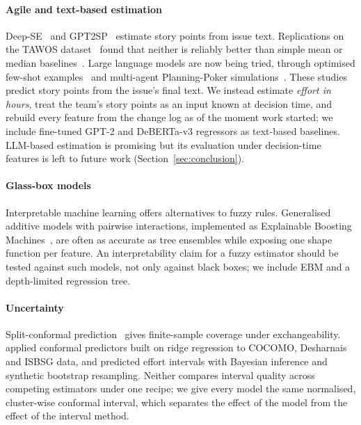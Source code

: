 \documentclass[preprint,12pt,authoryear]{elsarticle}
\begin{document}
\paragraph{Agile and text-based estimation}
Deep-SE~\citep{choetkiertikul2019deepse} and GPT2SP~\citep{fu2022gpt2sp} estimate story points from issue text.
Replications on the TAWOS dataset~\citep{tawosi2022tawos} found that neither is reliably better than simple mean or
median baselines~\citep{tawosi2023deepse,tawosi2022gpt2sprep}.  Large language models are now being tried, through
optimised few-shot examples~\citep{tawosi2023llmshots} and multi-agent Planning-Poker
simulations~\citep{bui2025seeagent}.  These studies predict story points from the issue's final text.  We instead
estimate \emph{effort in hours}, treat the team's story points as an input known at decision time, and rebuild every
feature from the change log as of the moment work started; we include fine-tuned GPT-2 and DeBERTa-v3 regressors
as text-based baselines.  LLM-based estimation is promising but its evaluation under decision-time features is
left to future work (Section~\ref{sec:conclusion}).

\paragraph{Glass-box models}
Interpretable machine learning offers alternatives to fuzzy rules.  Generalised additive models with pairwise
interactions, implemented as Explainable Boosting Machines~\citep{lou2013ga2m,nori2019interpretml}, are often as
accurate as tree ensembles while exposing one shape function per feature.  An interpretability claim for a fuzzy
estimator should be tested against such models, not only against black boxes; we include EBM and a depth-limited
regression tree.

\paragraph{Uncertainty}
Split-conformal prediction~\citep{vovk2005,lei2018conformal,angelopoulos2023gentle} gives finite-sample coverage under
exchangeability.  \citet{andreou2009conformal} applied conformal predictors built on ridge regression to COCOMO,
Desharnais and ISBSG data, and \citet{song2019interval} predicted effort intervals with Bayesian inference and
synthetic bootstrap resampling.  Neither compares interval quality across competing estimators under one recipe; we
give every model the same normalised, cluster-wise conformal interval, which separates the effect of the model from
the effect of the interval method.
\end{document}
